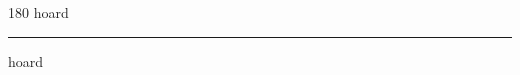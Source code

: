 
\begin{frame}
\begin{center}
\begin{turn}{180}
{\fontsize{2.5cm}{1em}\selectfont hoard}
\end{turn}
\vspace{1em}\par  
\hrule
\vspace{1em}\par  
{\fontsize{2.5cm}{1em}\selectfont hoard}
\end{center}
\end{frame}
